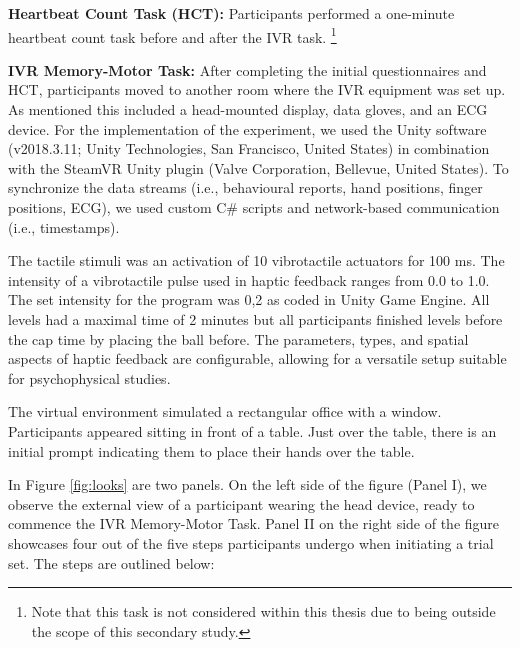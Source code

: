 \documentclass[12pt,oneside,openright]{report}
\begin{document}
\textbf{Heartbeat Count Task (HCT):} Participants performed a one-minute heartbeat count task before and after the IVR task. \footnote{Note that this task is not considered within this thesis due to being outside the scope of this secondary study.}

\textbf{IVR Memory-Motor Task:} 
After completing the initial questionnaires and HCT, participants moved to another room where the IVR equipment was set up. As mentioned this included a head-mounted display, data gloves, and an ECG device. 
For the implementation of the experiment, we used the Unity software (v2018.3.11; Unity Technologies, San Francisco, United States)  in combination with the SteamVR Unity plugin (Valve Corporation, Bellevue, United States). To synchronize the data streams (i.e., behavioural reports, hand positions, finger positions, ECG), we used custom C\# scripts and network-based communication (i.e., timestamps). 

The tactile stimuli was an activation of 10 vibrotactile actuators for 100 ms. The intensity of a vibrotactile pulse used in haptic feedback ranges from 0.0 to 1.0. The set intensity for the program was 0,2 as coded in Unity Game Engine. All levels had a maximal time of 2 minutes but all participants finished levels before the cap time by placing the ball before. The parameters, types, and spatial aspects of haptic feedback are configurable, allowing for a versatile setup suitable for psychophysical studies.

The virtual environment simulated a rectangular office with a window. Participants appeared sitting in front of a table. Just over the table, there is an initial prompt indicating them to place their hands over the table. 

In Figure \ref{fig:looks} are two panels. On the left side of the figure (Panel I), we observe the external view of a participant wearing the head device, ready to commence the IVR Memory-Motor Task. Panel II on the right side of the figure showcases four out of the five steps participants undergo when initiating a trial set. The steps are outlined below:
\end{document}
